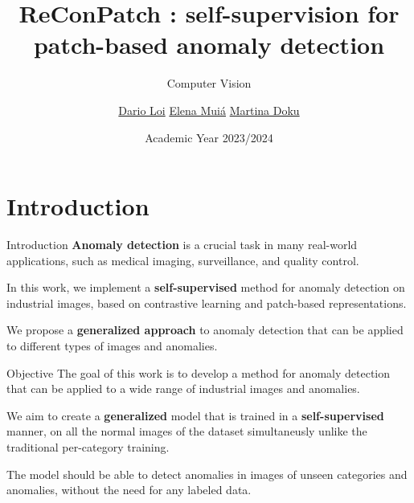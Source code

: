 \documentclass{beamer}
\title{ReConPatch : self-supervision for patch-based anomaly detection}
\subtitle{Computer Vision}
\author{\href{mailto:loi.1940849@studenti.uniroma1.it}{Dario Loi} \hspace{1em} \href{mailto:muia.1938610@studenti.uniroma1.it}{Elena Muiá} \hspace{1em} \href{mailto:doku.1938629@studenti.uniroma1.it}{Martina Doku}\\}
\date{Academic Year 2023/2024}
\begin{document}
\maketitle

\section{Introduction}
\begin{frame}{Introduction}
      \textbf{Anomaly detection} is a crucial task in many real-world applications,
       such as medical imaging, surveillance, and quality control.\newline 


        In this work, we implement a \textbf{self-supervised} method for anomaly detection
         on industrial images, based on contrastive learning and patch-based
          representations.\newline

          We propose a \textbf{generalized approach} to anomaly detection that can be applied
           to different types of images and anomalies.
          
\end{frame}
\begin{frame}{Objective}
      The goal of this work is to develop a method for anomaly detection that can
       be applied to a wide range of industrial images and anomalies.\newline

        We aim to create a \textbf{generalized} model that is 
        trained in a \textbf{self-supervised} manner, on all the normal images of the
         dataset simultaneusly unlike the traditional per-category training.\newline

          The model should be able to detect anomalies in images of unseen categories
           and anomalies, without the need for any labeled data.
\end{frame}
\end{document}
